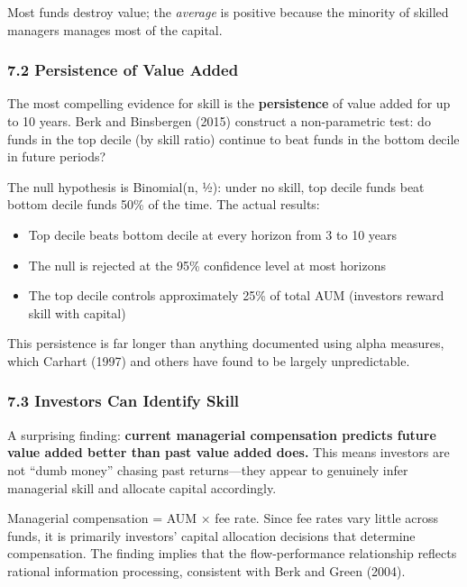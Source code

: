 \documentclass[
  letterpaper,
  DIV=11,
  numbers=noendperiod]{scrartcl}
\providecommand{\tightlist}{%
  \setlength{\itemsep}{0pt}\setlength{\parskip}{0pt}}
\begin{document}
Most funds destroy value; the \emph{average} is positive because the
minority of skilled managers manages most of the capital.

\subsubsection{7.2 Persistence of Value
Added}\label{persistence-of-value-added}

The most compelling evidence for skill is the \textbf{persistence} of
value added for up to 10 years. Berk and Binsbergen (2015) construct a
non-parametric test: do funds in the top decile (by skill ratio)
continue to beat funds in the bottom decile in future periods?

The null hypothesis is Binomial(n, ½): under no skill, top decile funds
beat bottom decile funds 50\% of the time. The actual results:

\begin{itemize}
\tightlist
\item
  Top decile beats bottom decile at every horizon from 3 to 10 years
\item
  The null is rejected at the 95\% confidence level at most horizons
\item
  The top decile controls approximately 25\% of total AUM (investors
  reward skill with capital)
\end{itemize}

This persistence is far longer than anything documented using alpha
measures, which Carhart (1997) and others have found to be largely
unpredictable.

\subsubsection{7.3 Investors Can Identify
Skill}\label{investors-can-identify-skill}

A surprising finding: \textbf{current managerial compensation predicts
future value added better than past value added does.} This means
investors are not ``dumb money'' chasing past returns---they appear to
genuinely infer managerial skill and allocate capital accordingly.

Managerial compensation = AUM × fee rate. Since fee rates vary little
across funds, it is primarily investors' capital allocation decisions
that determine compensation. The finding implies that the
flow-performance relationship reflects rational information processing,
consistent with Berk and Green (2004).
\end{document}

